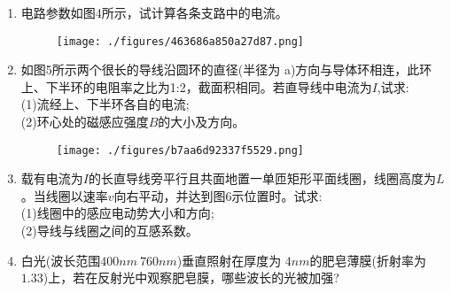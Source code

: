 \begin{enumerate}
\begin{figure}[ht]
\caption{} \label{fig_SD15_1}
\end{figure}
\item 电路参数如图4所示，试计算各条支路中的电流。
\begin{figure}[ht]
\centering
\texttt{[image: ./figures/463686a850a27d87.png]}
\caption{} \label{fig_SD15_4}
\end{figure}
\item 如图5所示两个很长的导线沿圆环的直径(半径为 a)方向与导体环相连，此环上、下半环的电阻率之比为1:2，截面积相同。若直导线中电流为$I$,试求:\\
(1)流经上、下半环各自的电流;\\
(2)环心处的磁感应强度$ B$的大小及方向。
\begin{figure}[ht]
\centering
\texttt{[image: ./figures/b7aa6d92337f5529.png]}
\caption{} \label{fig_SD15_5}
\end{figure}
\item 载有电流为$I$的长直导线旁平行且共面地置一单匝矩形平面线圈，线圈高度为$L$。当线圈以速率$v$向右平动，并达到图6示位置时。试求:\\
(1)线圈中的感应电动势大小和方向;\\
(2)导线与线圈之间的互感系数。
\item 白光(波长范围$400nm~760nm$)垂直照射在厚度为 $4nm $的肥皂薄膜(折射率为$1.33$)上，若在反射光中观察肥皂膜，哪些波长的光被加强?
\end{enumerate}